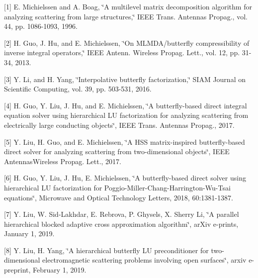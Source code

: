 \mbox{[}1\mbox{]} E. Michielssen and A. Boag, \char`\"{}\+A multilevel matrix decomposition algorithm for analyzing scattering from large structures,\char`\"{} IEEE Trans. Antennas Propag., vol. 44, pp. 1086-\/1093, 1996.

\mbox{[}2\mbox{]} H. Guo, J. Hu, and E. Michielssen, \char`\"{}\+On MLMDA/butterfly compressibility of inverse integral operators,\char`\"{} IEEE Antenn. Wireless Propag. Lett., vol. 12, pp. 31-\/34, 2013.

\mbox{[}3\mbox{]} Y. Li, and H. Yang, \char`\"{}\+Interpolative butterfly factorization,\char`\"{} SIAM Journal on Scientific Computing, vol. 39, pp. 503-\/531, 2016.

\mbox{[}4\mbox{]} H. Guo, Y. Liu, J. Hu, and E. Michielssen, \char`\"{}\+A butterfly-\/based direct integral equation solver using hierarchical LU factorization for analyzing scattering from electrically large conducting objects\char`\"{}, IEEE Trans. Antennas Propag., 2017.

\mbox{[}5\mbox{]} Y. Liu, H. Guo, and E. Michielssen, \char`\"{}\+A HSS matrix-\/inspired butterfly-\/based direct solver for analyzing scattering from two-\/dimensional objects\char`\"{}, IEEE Antennas\+Wireless Propag. Lett., 2017.

\mbox{[}6\mbox{]} H. Guo, Y. Liu, J. Hu, E. Michielssen, \char`\"{}\+A butterfly-\/based direct solver using hierarchical LU factorization for Poggio-\/\+Miller-\/\+Chang-\/\+Harrington-\/\+Wu-\/\+Tsai equations\char`\"{}, Microwave and Optical Technology Letters, 2018, 60\+:1381-\/1387.

\mbox{[}7\mbox{]} Y. Liu, W. Sid-\/\+Lakhdar, E. Rebrova, P. Ghysels, X. Sherry Li, \char`\"{}\+A parallel hierarchical blocked adaptive cross approximation algorithm\char`\"{}, ar\+Xiv e-\/prints, January 1, 2019.

\mbox{[}8\mbox{]} Y. Liu, H. Yang, \char`\"{}\+A hierarchical butterfly LU preconditioner for two-\/dimensional electromagnetic scattering problems involving open surfaces\char`\"{}, arxiv e-\/preprint, February 1, 2019. 